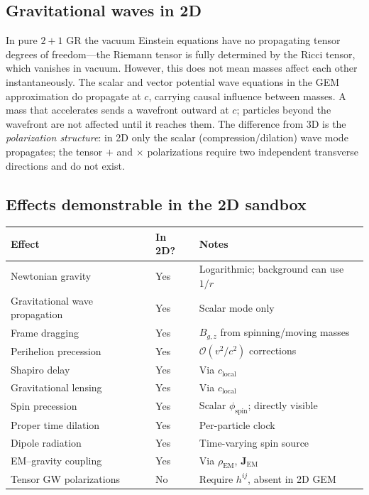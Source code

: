 \documentclass[11pt,a4paper]{article}
\newcommand{\vv}[1]{\mathbf{#1}}
\newcommand{\order}[1]{\mathcal{O}(#1)}
\begin{document}
\subsection{Gravitational waves in 2D}

In pure $2+1$ GR the vacuum Einstein equations have no propagating tensor degrees of freedom---the Riemann tensor is fully determined by the Ricci tensor, which vanishes in vacuum.  However, this does not mean masses affect each other instantaneously.  The scalar and vector potential wave equations in the GEM approximation do propagate at $c$, carrying causal influence between masses.  A mass that accelerates sends a wavefront outward at $c$; particles beyond the wavefront are not affected until it reaches them.  The difference from 3D is the \emph{polarization structure}: in 2D only the scalar (compression/dilation) wave mode propagates; the tensor $+$ and $\times$ polarizations require two independent transverse directions and do not exist.

\subsection{Effects demonstrable in the 2D sandbox}

\begin{center}
\begin{tabular}{@{}L{4.5cm}L{2cm}L{6.5cm}@{}}
\toprule
\textbf{Effect} & \textbf{In 2D?} & \textbf{Notes} \\
\midrule
Newtonian gravity          & Yes & Logarithmic; background can use $1/r$ \\
Gravitational wave propagation & Yes & Scalar mode only \\
Frame dragging             & Yes & $B_{g,z}$ from spinning/moving masses \\
Perihelion precession      & Yes & $\order{v^2/c^2}$ corrections \\
Shapiro delay              & Yes & Via $c_{\mathrm{local}}$ \\
Gravitational lensing      & Yes & Via $c_{\mathrm{local}}$ \\
Spin precession            & Yes & Scalar $\phi_{\mathrm{spin}}$; directly visible \\
Proper time dilation       & Yes & Per-particle clock \\
Dipole radiation           & Yes & Time-varying spin source \\
EM--gravity coupling       & Yes & Via $\rho_{\mathrm{EM}}$, $\vv{J}_{\mathrm{EM}}$ \\
Tensor GW polarizations    & No  & Require $h^{ij}$, absent in 2D GEM \\
\bottomrule
\end{tabular}
\end{center}
\end{document}
